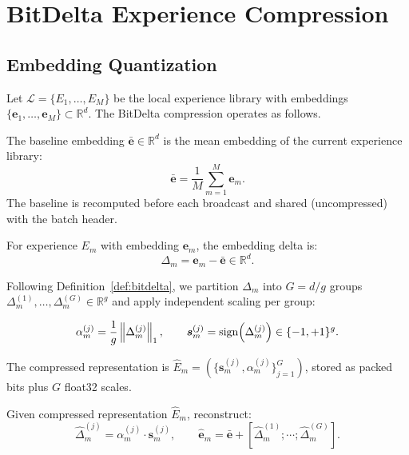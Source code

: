 \section{BitDelta Experience Compression}

\label{sec:bitdelta}

\subsection{Embedding Quantization}

Let $\mathcal{L} = \{E_1, \ldots, E_M\}$ be the local experience library with
embeddings $\{\bm{e}_1, \ldots, \bm{e}_M\} \subset \mathbb{R}^d$. The BitDelta
compression operates as follows.

\begin{definition}
The baseline embedding $\bar{\bm{e}} \in \mathbb{R}^d$ is the mean embedding
of the current experience library:
\begin{equation}
    \bar{\bm{e}} = \frac{1}{M} \sum_{m=1}^{M} \bm{e}_m.
    \label{eq:baseline}
\end{equation}
The baseline is recomputed before each broadcast and shared (uncompressed)
with the batch header.
\end{definition}

\begin{definition}
For experience $E_m$ with embedding $\bm{e}_m$, the embedding delta is:
\begin{equation}
    \Delta_m = \bm{e}_m - \bar{\bm{e}} \in \mathbb{R}^d.
    \label{eq:delta}
\end{equation}
\end{definition}

Following Definition~\ref{def:bitdelta}, we partition $\Delta_m$ into
$G = d / g$ groups $\Delta_m^{(1)}, \ldots, \Delta_m^{(G)} \in \mathbb{R}^g$
and apply independent scaling per group:

\begin{equation}
    \alpha_m^{(j)} = \frac{1}{g} \left\|\Delta_m^{(j)}\right\|_1,
    \qquad
    \bm{s}_m^{(j)} = \operatorname{sign}\!\left(\Delta_m^{(j)}\right) \in \{-1,+1\}^g.
    \label{eq:group-quantize}
\end{equation}

The compressed representation is $\widehat{E}_m = \left(\{\bm{s}_m^{(j)}, \alpha_m^{(j)}\}_{j=1}^G\right)$,
stored as packed bits plus $G$ float32 scales.

\begin{definition}[Reconstruction]
Given compressed representation $\widehat{E}_m$, reconstruct:
\begin{equation}
    \hat{\Delta}_m^{(j)} = \alpha_m^{(j)} \cdot \bm{s}_m^{(j)},
    \qquad
    \hat{\bm{e}}_m = \bar{\bm{e}} + \left[\hat{\Delta}_m^{(1)}; \cdots; \hat{\Delta}_m^{(G)}\right].
    \label{eq:reconstruct}
\end{equation}
\end{definition}

